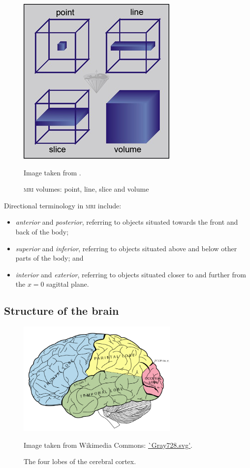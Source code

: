 \begin{figure}[ht]
	\centering
	\includegraphics[scale=0.6]{Images/2_mri_volumes.jpg}
	\caption{\textsc{mri} volumes: point, line, slice and volume}
	\small Image taken from \cite{Rinck2013}.
	\label{svd-term-fig}
\end{figure}

Directional terminology in \textsc{mri} include:
\begin{itemize}
	\item \textit{anterior} and \textit{posterior}, referring to objects situated towards the front and back of the body;
	\item \textit{superior} and \textit{inferior}, referring to objects situated above and below other parts of the body; and
	\item \textit{interior} and \textit{exterior}, referring to objects situated closer to and further from the $x=0$ sagittal plane.
\end{itemize}

\subsection*{Structure of the brain}\label{svd-brain}

\begin{figure}[ht]
	\centering
	\includegraphics[width=0.7\textwidth]{Images/2_Lobes_of_the_brain_NL.png}
	\caption{The four lobes of the cerebral cortex.}
	\small Image taken from Wikimedia Commons: \url{`Gray728.svg'}.
	\label{svd-cerebrumfig}
\end{figure}

